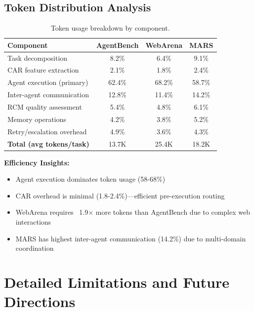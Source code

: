 \documentclass{article}
\theoremstyle{plain}
\theoremstyle{definition}
\theoremstyle{remark}
\begin{document}
\subsection{Token Distribution Analysis}

\begin{table}[h]
\centering
\caption{Token usage breakdown by component.}
\label{tab:token-breakdown}
\small
\begin{tabular}{lccc}
\toprule
\textbf{Component} & \textbf{AgentBench} & \textbf{WebArena} & \textbf{MARS} \\
\midrule
Task decomposition & 8.2\% & 6.4\% & 9.1\% \\
CAR feature extraction & 2.1\% & 1.8\% & 2.4\% \\
Agent execution (primary) & 62.4\% & 68.2\% & 58.7\% \\
Inter-agent communication & 12.8\% & 11.4\% & 14.2\% \\
RCM quality assessment & 5.4\% & 4.8\% & 6.1\% \\
Memory operations & 4.2\% & 3.8\% & 5.2\% \\
Retry/escalation overhead & 4.9\% & 3.6\% & 4.3\% \\
\midrule
\textbf{Total (avg tokens/task)} & 13.7K & 25.4K & 18.2K \\
\bottomrule
\end{tabular}
\end{table}

\textbf{Efficiency Insights:}
\begin{itemize}[nosep,leftmargin=*]
\item Agent execution dominates token usage (58-68\%)
\item CAR overhead is minimal (1.8-2.4\%)---efficient pre-execution routing
\item WebArena requires ~1.9$\times$ more tokens than AgentBench due to complex web interactions
\item MARS has highest inter-agent communication (14.2\%) due to multi-domain coordination
\end{itemize}

\section{Detailed Limitations and Future Directions}
\label{app:limitations}
\end{document}
